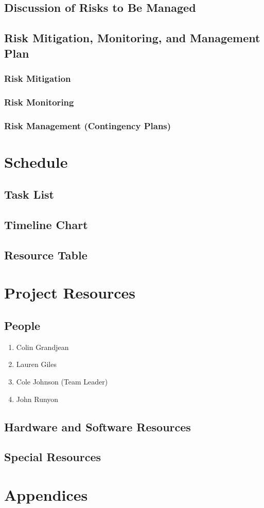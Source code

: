 \documentclass[english,12pt]{article}
\begin{document}
\subsection{Discussion of Risks to Be Managed}

\subsection{Risk Mitigation, Monitoring, and Management Plan}

\subsubsection{Risk Mitigation}

\subsubsection{Risk Monitoring}

\subsubsection{Risk Management (Contingency Plans)}

\section{Schedule}

\subsection{Task List}

\subsection{Timeline Chart}

\subsection{Resource Table}

\section{Project Resources}

\subsection{People}
\begin{enumerate}
  \item Colin Grandjean 
  \item Lauren Giles   
  \item Cole Johnson (Team Leader)
  \item John Runyon    
\end{enumerate}
\subsection{Hardware and Software Resources}

\subsection{Special Resources}

\section{Appendices}
\end{document}
